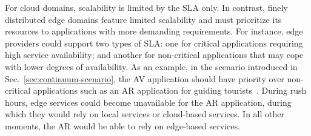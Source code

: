 
For cloud domains, scalability is limited by the SLA only. In contrast, finely distributed edge domains feature limited scalability and must prioritize its resources to applications with more demanding requirements.
For instance, edge providers could support two types of SLA: one for critical applications requiring high service availability; and another for non-critical applications that may cope with lower degrees of availability. 
As an example, in the scenario introduced in Sec.~\ref{sec:continuum-scenario}, the AV application should have priority over non-critical applications such as an AR application for guiding tourists~\cite{GarrigaMendonca2017}. During rush hours, edge services could become unavailable for the AR application, during which they would rely on local services or cloud-based services. In all other moments, the AR would be able to rely on edge-based services. 


